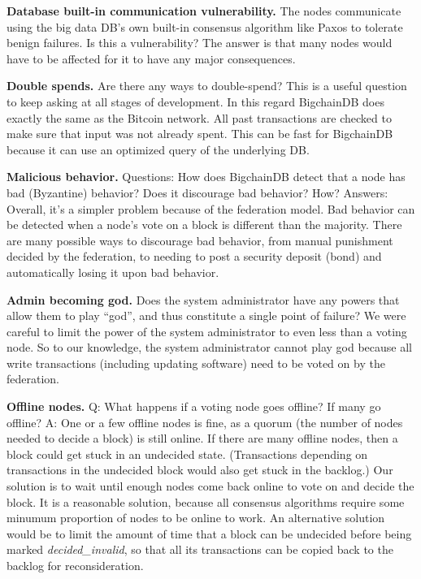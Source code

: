 \medskip
\noindent\textbf{Database built-in communication vulnerability.} 
The nodes communicate using the big data DB’s own built-in consensus algorithm like Paxos to tolerate benign failures. 
Is this a vulnerability? The answer is that many nodes would have to be affected for it to have any major consequences.

\medskip
\noindent\textbf{Double spends.} 
Are there any ways to double-spend? 
This is a useful question to keep asking at all stages of development. 
In this regard BigchainDB does exactly the same as the Bitcoin network. All past transactions are checked to make sure that input was not already spent. This can be fast for BigchainDB because it can use an optimized query of the underlying DB.

\medskip
\noindent\textbf{Malicious behavior.} 
Questions: How does BigchainDB detect that a node has bad (Byzantine) behavior? 
Does it discourage bad behavior? How? 
Answers: Overall, it’s a simpler problem because of the federation model. 
Bad behavior can be detected when a node’s vote on a block is different than the majority. 
There are many possible ways to discourage bad behavior, from manual punishment decided by the federation, to needing to post a security deposit (bond) and automatically losing it upon bad behavior. 

\medskip
\noindent\textbf{Admin becoming god.} 
Does the system administrator have any powers that allow them to play “god”, and thus constitute a single point of failure? 
We were careful to limit the power of the system administrator to even less than a voting node. 
So to our knowledge, the system administrator cannot play god because all write transactions (including updating software) need to be voted on by the federation. 

\medskip
\noindent\textbf{Offline nodes.} 
Q: What happens if a voting node goes offline? If many go offline? 
A: One or a few offline nodes is fine, as a quorum (the number of nodes needed to decide a block) is still online. 
If there are many offline nodes, then a block could get stuck in an undecided state. (Transactions depending on transactions in the undecided block would also get stuck in the backlog.)
Our solution is to wait until enough nodes come back online to vote on and decide the block. It is a reasonable solution, because all consensus algorithms require some minumum proportion of nodes to be online to work.
An alternative solution would be to limit the amount of time that a block can be undecided before being marked \textsf{\textit{decided\_invalid}}, so that all its transactions can be copied back to the backlog for reconsideration.


